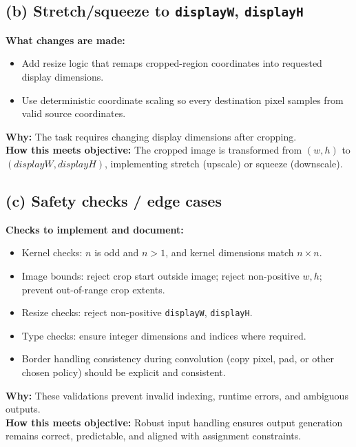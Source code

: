\documentclass[11pt]{article}
\begin{document}
\subsection*{(b) Stretch/squeeze to \texttt{displayW}, \texttt{displayH}}
\textbf{What changes are made:}
\begin{itemize}[leftmargin=1.2em]
    \item Add resize logic that remaps cropped-region coordinates into requested display dimensions.
    \item Use deterministic coordinate scaling so every destination pixel samples from valid source coordinates.
\end{itemize}
\textbf{Why:} The task requires changing display dimensions after cropping.\\
\textbf{How this meets objective:} The cropped image is transformed from \((w,h)\) to \((displayW,displayH)\), implementing stretch (upscale) or squeeze (downscale).

\subsection*{(c) Safety checks / edge cases}
\textbf{Checks to implement and document:}
\begin{itemize}[leftmargin=1.2em]
    \item Kernel checks: \(n\) is odd and \(n>1\), and kernel dimensions match \(n\times n\).
    \item Image bounds: reject crop start outside image; reject non-positive \(w,h\); prevent out-of-range crop extents.
    \item Resize checks: reject non-positive \texttt{displayW}, \texttt{displayH}.
    \item Type checks: ensure integer dimensions and indices where required.
    \item Border handling consistency during convolution (copy pixel, pad, or other chosen policy) should be explicit and consistent.
\end{itemize}
\textbf{Why:} These validations prevent invalid indexing, runtime errors, and ambiguous outputs.\\
\textbf{How this meets objective:} Robust input handling ensures output generation remains correct, predictable, and aligned with assignment constraints.
\end{document}

